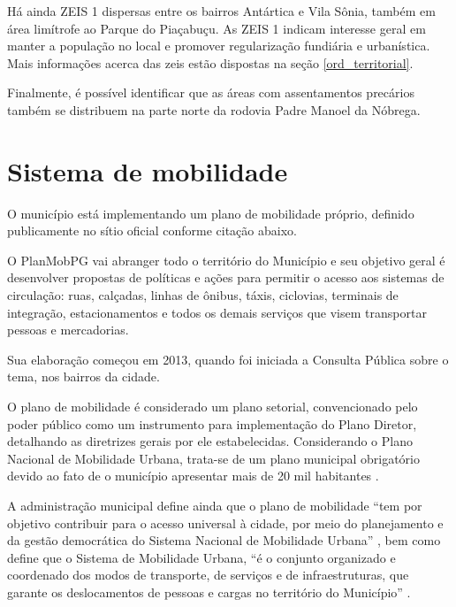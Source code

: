 	Há ainda ZEIS 1 dispersas entre os bairros Antártica e Vila Sônia, também em área limítrofe ao Parque do Piaçabuçu. As ZEIS 1 indicam interesse geral em manter a população no local e promover regularização fundiária e urbanística. Mais informações acerca das \gls{zeis} estão dispostas na seção \ref{ord_territorial}.
	
	Finalmente, é possível identificar que as áreas com assentamentos precários também se distribuem na parte norte da rodovia Padre Manoel da Nóbrega.
	
	\section{Sistema de mobilidade}
	
	O município está implementando um plano de mobilidade próprio, definido publicamente no sítio oficial conforme citação abaixo.
	
	\begin{citacao}		
		O PlanMobPG vai abranger todo o território do Município e seu objetivo geral é desenvolver propostas de políticas e ações para permitir o acesso aos sistemas de circulação: ruas, calçadas, linhas de ônibus, táxis, ciclovias, terminais de integração, estacionamentos e todos os demais serviços que visem transportar pessoas e mercadorias.
		
		Sua elaboração começou em 2013, quando foi iniciada a Consulta Pública sobre o tema, nos bairros da cidade.
		
		\cite{pmpg2017a}
	\end{citacao}
	
	O plano de mobilidade é considerado um plano setorial, convencionado pelo poder público como um instrumento para implementação do Plano Diretor, detalhando as diretrizes gerais por ele estabelecidas. Considerando o Plano Nacional de Mobilidade Urbana, trata-se de um plano municipal obrigatório devido ao fato de o município apresentar mais de 20 mil habitantes \cite[Art. 24\textordmasculine, \S 1\textordmasculine]{gf2012a}.
	
	A administração municipal define ainda que o plano de mobilidade ``tem por objetivo contribuir para o acesso universal à cidade, por meio do planejamento e da gestão democrática do Sistema Nacional de Mobilidade Urbana'' \cite{pmpg2017b}, bem como define que o Sistema de Mobilidade Urbana, ``é o conjunto organizado e coordenado dos modos de transporte, de serviços e de infraestruturas, que garante os deslocamentos de pessoas e cargas no território do Município'' \cite{pmpg2017b}.

